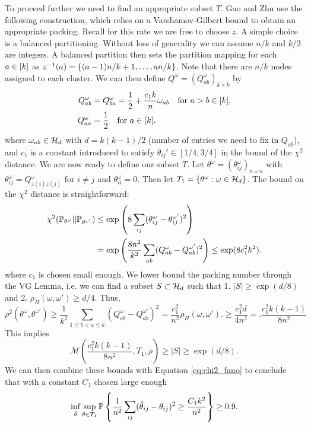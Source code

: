 \documentclass[11pt]{article}
\begin{document}
To proceed further we need to find an appropriate subset $T$. Gao and Zhu use the following construction, which relies on a Varshamov-Gilbert bound to obtain an appropriate packing. Recall for this rate we are free to choose $z$. A simple choice is a balanced partitioning. Without loss of generality we can assume $n / k$ and $k / 2$ are integers. A balanced partition then sets the partition mapping for each $a \in \lbrack k\rbrack$ as $z^{-1}(a) = \{(a-1)n/k + 1, \dots, an/k\}$. Note that there are $n/k$ nodes assigned to each cluster. We can then define $Q^{\omega} = (Q_{ab}^{\omega})_{k \times k}$ by
\begin{equation}
\begin{aligned}
Q^{\omega}_{ab} &= Q^{\omega}_{ba} = \frac{1}{2} + \frac{c_1 k}{n} \omega_{ab} \quad \text{for } a > b \in \lbrack k\rbrack, \\
Q_{aa}^{\omega} &= \frac{1}{2} \quad \text{for } a \in \lbrack k\rbrack.
\end{aligned}
\end{equation}
where $\omega_{ab} \in \mathcal{H}_d$ with $d = k(k-1)/2$ (number of entries we need to fix in $Q_{ab}$), and $c_1$ is a constant introduced to satisfy $\theta_{ij}' \in [1/4, 3/4]$ in the bound of the $\chi^2$ distance. We are now ready to define our subset $T$. Let $\theta^{\omega} = (\theta_{ij}^{\omega})_{n \times n}$ with $\theta_{ij}^{\omega} = Q_{z(i)z(j)}^{\omega}$ for $i \neq j$ and $\theta_{ii}^{\omega} = 0$. Then let $T_1 = \{\theta^{\omega} : \omega \in \mathcal{H}_d\}$. The bound on the $\chi^2$ distance is straightforward:
\begin{equation}
\begin{aligned}
\chi^2(\mathbb{P}_{\theta^{\omega}} || \mathbb{P}_{\theta^{\omega'}}) &\leq \exp\left(8 \sum_{ij} (\theta_{ij}^{\omega} - \theta_{ij}^{\omega'})^2\right) \\
&= \exp\left(\frac{8 n^2}{k^2} \sum_{ab} (Q_{ab}^{\omega} - Q_{ab}^{\omega'})^2\right)
\leq \exp(8 c_1^2 k^2).
\end{aligned}
\end{equation}
where $c_1$ is chosen small enough. We lower bound the packing number through the VG Lemma, i.e.
we can find a subset $S \subset \mathcal{H}_d$ such that 1. $|S| \geq \exp(d/8)$ and 2. $\rho_{H}(\omega, \omega') \geq d/4$. Thus,
\begin{equation}
\rho^2(\theta^{\omega}, \theta^{\omega'}) \geq \frac{1}{k^2} \sum_{1 \leq b < a \leq k} (Q_{ab}^{\omega} - Q_{ab}^{\omega'})^2 = \frac{c_1^2}{n^2} \rho_{H}(\omega, \omega').\geq \frac{c_1^2 d}{4 n^2} = .\frac{c_1^2 k(k-1)}{8 n^2}
\end{equation}
This implies
\begin{equation}
\mathcal{M}\left(\frac{c_1^2 k(k-1)}{8 n^2}, T_1, \rho\right) \geq |S| \geq \exp(d/8).
\end{equation}
We can then combine these bounds with Equation \ref{eq:chi2_fano} to conclude that with a constant $C_1$ chosen large enough
\begin{equation}
\inf_{\hat{\theta}} \sup_{\theta \in T_1} \mathbb{P} \left\{\frac{1}{n^2} \sum_{ij} (\hat{\theta}_{ij} - \theta_{ij})^2 \geq \frac{C_1 k^2}{n^2} \right\} \geq 0.9.
\end{equation}
\end{document}
